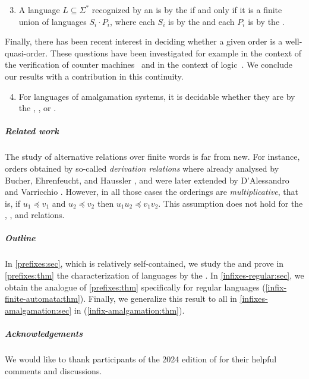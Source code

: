 {
\renewcommand{\labelenumi}{R\arabic{enumi}}
\begin{enumerate}
	\setcounter{enumi}{2}
	\item A language $L \subseteq \Sigma^*$ recognized by an  is  by the  if and only if it is a finite union of languages $S_i \cdot P_i$, where each $S_i$ is  by the  and each $P_i$ is  by the .
\end{enumerate}
}


Finally, there has been recent interest in deciding whether a given order is a
well-quasi-order. These questions have been investigated for example in the
context of the verification of counter
machines~\cite{DBLP:conf/fsttcs/FinkelG19} and in the context of
logic~\cite{DBLP:journals/pacmpl/BergstrasserGLZ24}. We conclude our results
with a contribution in this continuity.

{
\renewcommand{\labelenumi}{R\arabic{enumi}}
\begin{enumerate}
	\setcounter{enumi}{3}
	\item For languages of amalgamation systems, it is decidable whether they are  by the , , or .
\end{enumerate}
}

\subparagraph{Related work} The study of alternative 
relations over finite words is far from new. For instance, orders obtained by
so-called \emph{derivation relations} where already analysed by Bucher,
Ehrenfeucht, and Haussler \cite{BUEUD85}, and were later extended by
D'Alessandro and Varricchio \cite{ALVA03,ALVA06}. However, in all those cases
the orderings are \emph{multiplicative}, that is, if $u_1 \preceq v_1$ and $u_2
\preceq v_2$ then $u_1u_2 \preceq v_1v_2$. This assumption does not hold for
the , , and  relations.

\subparagraph{Outline} In
\cref{prefixes:sec}, which is relatively
self-contained, we study the  and prove in
\cref{prefixes:thm} the characterization of 
languages by the . In
\cref{infixes-regular:sec}, we
obtain the  analogue of \cref{prefixes:thm}
specifically for regular languages
(\cref{infix-finite-automata:thm}). Finally, we generalize this result to all
 in \cref{infixes-amalgamation:sec}
in
(\cref{infix-amalgamation:thm}).

\subparagraph{Acknowledgements} We would like to thank participants of the 2024
edition of  for their helpful comments and discussions.
